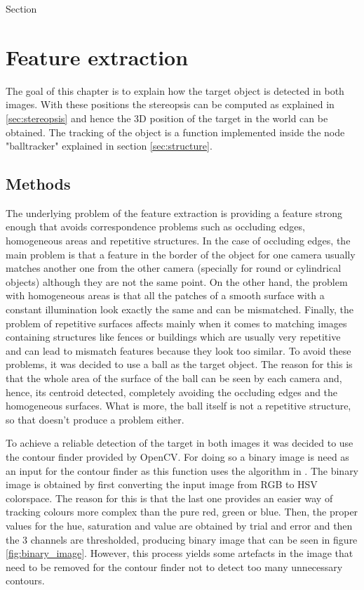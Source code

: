 Section\section{Feature extraction} %
\label{sec:feature_extraction}
The goal of this chapter is to explain how the target object is detected in both images. With these positions the stereopsis can be computed as explained in \ref{sec:stereopsis} and hence the 3D position of the target in the world can be obtained.
The tracking of the object is a function implemented inside the node "balltracker" explained in section \ref{sec:structure}.

\subsection{Methods}
The underlying problem of the feature extraction is providing a feature strong enough that avoids correspondence problems such as occluding edges, homogeneous areas and repetitive structures.
In the case of occluding edges, the main problem is that a feature in the border of the object for one camera usually matches another one from the other camera (specially for round or cylindrical objects) although they are not the same point.
On the other hand, the problem with homogeneous areas is that all the patches of a smooth surface with a constant illumination look exactly the same and can be mismatched.
Finally, the problem of repetitive surfaces affects mainly when it comes to matching images containing structures like fences or buildings which are usually very repetitive and can lead to mismatch features because they look too similar.
To avoid these problems, it was decided to use a ball as the target object.
The reason for this is that the whole area of the surface of the ball can be seen by each camera and, hence, its centroid detected, completely avoiding the occluding edges and the homogeneous surfaces. What is more, the ball itself is not a repetitive structure, so that doesn't produce a problem either.

To achieve a reliable detection of the target in both images it was decided to use the contour finder provided by OpenCV.
For doing so a binary image is need as an input for the contour finder as this function uses the algorithm in \cite{suzuki}. 
The binary image is obtained by first converting the input image from RGB to HSV colorspace.
The reason for this is that the last one provides an easier way of tracking colours more complex than the pure red, green or blue.
Then, the proper values for the hue, saturation and value are obtained by trial and error and then the 3 channels are thresholded, producing binary image that can be seen in figure \ref{fig:binary_image}.
However, this process yields some artefacts in the image that need to be removed for the contour finder not to detect too many unnecessary contours.
 
